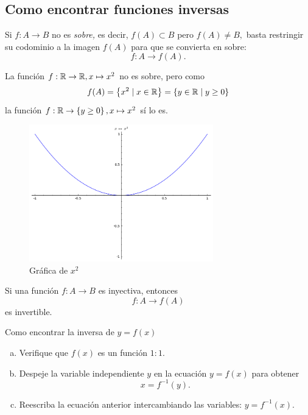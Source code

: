 \subsection{Como encontrar funciones inversas}


Si $f:A \to B$ no es \emph{sobre,} es decir, $f(A) \subset B$ pero $f(A)\neq B,$ basta restringir su codominio a la imagen $f(A)$ para que se convierta en {sobre}:
$$
f: A \to f(A).
$$



\begin{exmp}
La funci\'on $f:\mathbb{R} \to \mathbb{R}, x \mapsto x^{2}$ no es sobre, pero como 
$$f(A)=\left\{ x^2\mid x\in\mathbb{R} \right\}=\left\{ y\in \mathbb{R} \mid y\geq 0 \right\}$$
la funci\'on $f: \mathbb{R}\to \left\{ y \geq 0 \right\}, x \mapsto x^{2}$ s\'i lo es.
\end{exmp}




\begin{figure}[h!]
\centering
\includegraphics[width=8cm,keepaspectratio=true]{./md/IMG-04_resticcion.png}
\caption{Gráfica de $x^2$}
\label{fig:0401}
\end{figure}




\begin{prop}
Si una funci\'on $f:A \to B$ es inyectiva, entonces
$$
f:A \to f(A)
$$ es invertible.
\end{prop}



{Como encontrar la inversa de $y=f(x)$}
\begin{enumerate}[(a)]
\item Verifique que $f(x)$ es un funci\'on $1:1.$ 
\item Despeje la variable independiente $y$ en la ecuaci\'on $y=f(x)$ para obtener
$$x=f^{-1}(y).$$ 
\item Reescriba la ecuaci\'on anterior intercambiando las variables: $y=f^{-1}(x).$
\end{enumerate}




